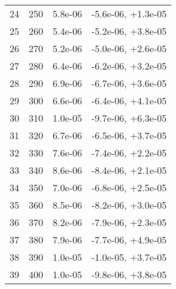 \begin{table}
\begin{adjustbox}{width=1\textwidth/2}
\begin{tabular}{|c|c|c|c|}
\cline{1-4}
24 & 250 & 5.8e-06 & -5.6e-06, +1.3e-05 \\
\cline{1-4}
25 & 260 & 5.4e-06 & -5.2e-06, +3.8e-05 \\
\cline{1-4}
26 & 270 & 5.2e-06 & -5.0e-06, +2.6e-05 \\
\cline{1-4}
27 & 280 & 6.4e-06 & -6.2e-06, +3.2e-05 \\
\cline{1-4}
28 & 290 & 6.9e-06 & -6.7e-06, +3.6e-05 \\
\cline{1-4}
29 & 300 & 6.6e-06 & -6.4e-06, +4.1e-05 \\
\cline{1-4}
30 & 310 & 1.0e-05 & -9.7e-06, +6.3e-05 \\
\cline{1-4}
31 & 320 & 6.7e-06 & -6.5e-06, +3.7e-05 \\
\cline{1-4}
32 & 330 & 7.6e-06 & -7.4e-06, +2.2e-05 \\
\cline{1-4}
33 & 340 & 8.6e-06 & -8.4e-06, +2.1e-05 \\
\cline{1-4}
34 & 350 & 7.0e-06 & -6.8e-06, +2.5e-05 \\
\cline{1-4}
35 & 360 & 8.5e-06 & -8.2e-06, +3.0e-05 \\
\cline{1-4}
36 & 370 & 8.2e-06 & -7.9e-06, +2.3e-05 \\
\cline{1-4}
37 & 380 & 7.9e-06 & -7.7e-06, +4.9e-05 \\
\cline{1-4}
38 & 390 & 1.0e-05 & -1.0e-05, +3.7e-05 \\
\cline{1-4}
39 & 400 & 1.0e-05 & -9.8e-06, +3.8e-05 \\
\cline{1-4}
\end{tabular}
\end{adjustbox}
\end{table}


